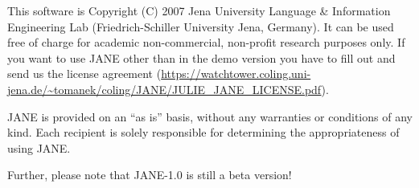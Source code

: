 \documentclass[DIV12,english,11pt,halfparskip]{scrartcl}
\begin{document}
This software is Copyright (C) 2007 Jena University Language \&
Information Engineering Lab (Friedrich-Schiller University Jena,
Germany). It can be used free of charge for academic non-commercial,
non-profit research purposes only. If you want to use JANE other than
in the demo version you have to fill out and send us the license
agreement
(\url{https://watchtower.coling.uni-jena.de/~tomanek/coling/JANE/JULIE_JANE_LICENSE.pdf}).

JANE is provided on an ``as is'' basis, without any warranties or
conditions of any kind. Each recipient is solely responsible for
determining the appropriateness of using JANE.

Further, please note that JANE-1.0 is still a beta version!
\end{document}
